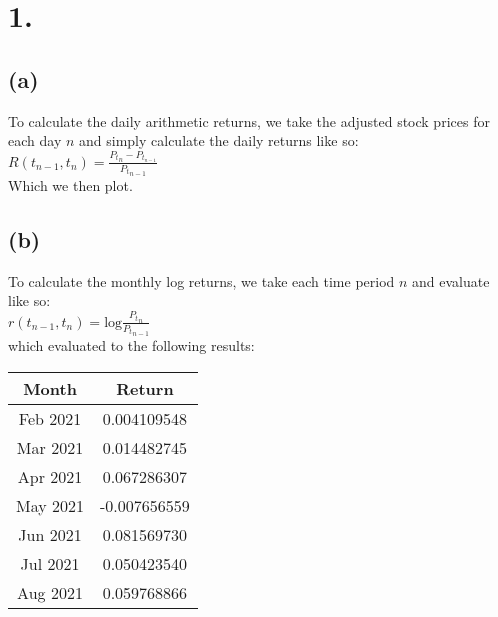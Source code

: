 \documentclass{article}
\begin{document}
\thispagestyle{firstpageheader}

\section*{1.}
{\Large 

\subsection*{(a)}

To calculate the daily arithmetic returns, we take the adjusted stock prices for each day $n$ and simply calculate the daily returns like so: \\
$R(t_{n-1}, t_n) = \frac{{P_t}_n - P_t_{n-1}}{{P_t}_{n-1}}$ \\
Which we then plot.

\subsection*{(b)}

To calculate the monthly log returns, we take each time period $n$ and evaluate like so: \\
$r(t_{n-1}, t_n) = \text{log}\frac{{P_t}_{n}}{{P_t}_{n-1}}$ \\
which evaluated to the following results: \\

\begin{tabular}{|c|c|}
	\hline
	\textbf{Month} & \textbf{Return} \\
	\hline
	Feb 2021 & 0.004109548 \\
	\hline
	Mar 2021 & 0.014482745 \\
	\hline
	Apr 2021 & 0.067286307 \\
	\hline
	May 2021 & -0.007656559 \\
	\hline
	Jun 2021 & 0.081569730 \\
	\hline
	Jul 2021 & 0.050423540 \\
	\hline
	Aug 2021 & 0.059768866 \\
	\hline
\end{tabular}

}
\end{document}
